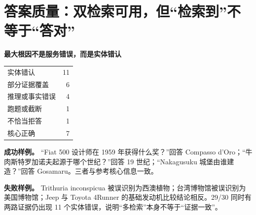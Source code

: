 \documentclass[11pt,a4paper]{ctexart}
\begin{document}
\section{答案质量：双检索可用，但“检索到”不等于“答对”}

\begin{minipage}[t]{0.46\textwidth}
\end{minipage}
\hfill
\begin{minipage}[t]{0.50\textwidth}
\begin{tcolorbox}[colback=Paper,colframe=Line,boxrule=.6pt,arc=2mm]
\textbf{最大根因不是服务错误，而是实体错认}\par
\vspace{1mm}
\begin{tabularx}{\linewidth}{X r}
实体错认 & 11 \\
部分证据覆盖 & 6 \\
推理或事实错误 & 4 \\
跑题或截断 & 1 \\
不恰当拒答 & 1 \\
核心正确 & 7 \\
\end{tabularx}
\end{tcolorbox}
\end{minipage}

\begin{greenbox}
\textbf{成功样例。} “Fiat 500 设计师在 1959 年获得什么奖？”回答 Compasso d'Oro；“牛肉斯特罗加诺夫起源于哪个世纪？”回答 19 世纪；“Nakagusuku 城堡由谁建造？”回答 Gosamaru。三者与参考核心信息一致。
\end{greenbox}

\begin{riskbox}
\textbf{失败样例。} Trithuria inconspicua 被误识别为西澳植物；台湾博物馆被误识别为美国博物馆；Jeep 与 Toyota 4Runner 的基础发动机比较结论相反。29/30 同时有两路证据仍出现 11 个实体错误，说明“多检索”本身不等于“证据一致”。
\end{riskbox}
\end{document}
